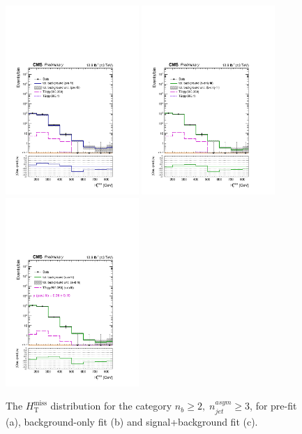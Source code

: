 \clearpage
\begin{figure}[tbhp]
    \caption{ 
    The $H_{\mathrm{T}}^{\mathrm{miss}}$ distribution for the category $n_{b}\geq 2, \; n_{jet}^{asym} \geq 3$, for pre-fit (a), background-only fit (b) and signal+background fit (c).
    \label{fig:mhtShape_ge2b_ge3a} }
  \begin{center}
  \includegraphics[width=0.45\textwidth]{mhtShape_ge2b_ge3a_200_Inf_prefit_aux} \hspace{1cm}
  \includegraphics[width=0.45\textwidth]{mhtShape_ge2b_ge3a_200_Inf_fit_b_aux} \\
  \includegraphics[width=0.45\textwidth]{mhtShape_ge2b_ge3a_200_Inf_fit_s_aux}
  \end{center}
\end{figure}



